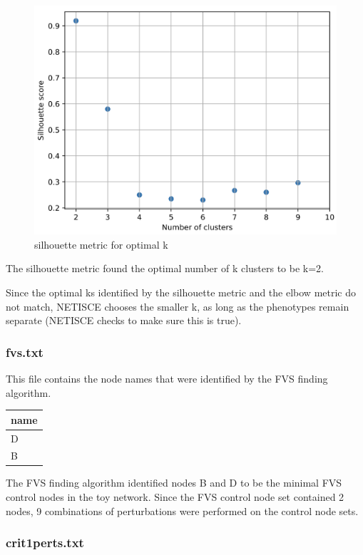 \documentclass[
]{book}
\begin{document}
\begin{figure}

{\centering \includegraphics[width=0.5\linewidth]{images/silhouette} 

}

\caption{silhouette metric for optimal k}\label{fig:unnamed-chunk-12}
\end{figure}

The silhouette metric found the optimal number of k clusters to be k=2.

Since the optimal ks identified by the silhouette metric and the elbow metric do not match, NETISCE chooses the smaller k, as long as the phenotypes remain separate (NETISCE checks to make sure this is true).

\hypertarget{section-id}{%
\subsubsection*{fvs.txt}\label{section-id}}

This file contains the node names that were identified by the FVS finding algorithm.

\begin{tabular}{l}
\hline
name\\
\hline
D\\
\hline
B\\
\hline
\end{tabular}

The FVS finding algorithm identified nodes B and D to be the minimal FVS control nodes in the toy network. Since the FVS control node set contained 2 nodes, 9 combinations of perturbations were performed on the control node sets.

\hypertarget{section-id}{%
\subsubsection*{crit1perts.txt}\label{section-id}}
\end{document}
